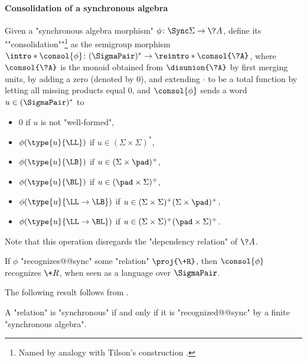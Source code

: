 \paragraph*{Consolidation of a synchronous algebra}
Given a "synchronous algebra morphism" $\phi\colon \Sync\Sigma \to \?A$,
define its \AP""consolidation""\footnote{Named by analogy with Tilson's construction \cite[\S 3, p.~102]{tilson_categories_1987}.} as the semigroup morphism
$\intro*\consol{\phi}\colon (\SigmaPair)^* \to \reintro*\consol{\?A}$, where
$\consol{\?A}$ is the monoid obtained from
$\disunion{\?A}$ by first merging units,
by adding a zero (denoted by $0$), and extending $\cdot$
to be a total function by letting all missing products equal $0$,
and $\consol{\phi}$ sends a word $u \in (\SigmaPair)^*$ to%
\vspace{-1.25em}
\begin{multicols}{2}%
	\begin{itemize}%
		\item $0$ if $u$ is not "well-formed",
		\item $\phi(\type{u}{\LL})$ if $u \in (\Sigma\times \Sigma)^*$,
		\item $\phi(\type{u}{\LB})$ if $u \in (\Sigma\times \pad)^+$,
		\item $\phi(\type{u}{\BL})$ if $u \in (\pad\times \Sigma)^+$,
		\item $\phi(\type{u}{\LL\to\LB})$ if $u \in (\Sigma\times \Sigma)^+(\Sigma\times \pad)^+$,
		\item $\phi(\type{u}{\LL\to\BL})$ if $u \in (\Sigma\times \Sigma)^+(\pad\times \Sigma)^+$.
	\end{itemize}
\end{multicols}
\vspace{-1.25em}
Note that this operation disregards the "dependency relation" of $\?A$.
\begin{fact}
	\AP\label{fact:consolidation}
	If $\phi$ "recognizes@@sync" some "relation" $\proj{\+R}$,
	then $\consol{\phi}$ recognizes $\+R$, when seen as
	a language over $\SigmaPair$.
\end{fact}

The following result follows from .
\begin{proposition}
	\AP\label{prop:synchronous-iff-finite}
	A "relation" is "synchronous" if and only if it is "recognized@@sync"
	by a finite "synchronous algebra".
\end{proposition}

